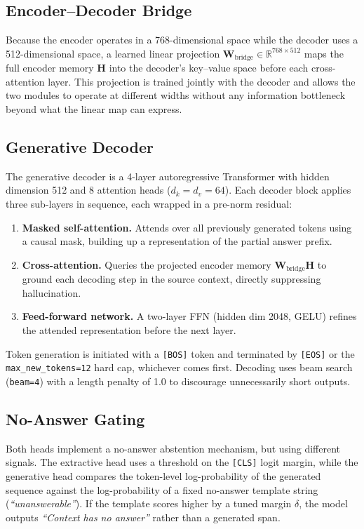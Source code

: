\documentclass[10pt,twocolumn]{article}
\begin{document}
\subsection{Encoder--Decoder Bridge}
Because the encoder operates in a 768-dimensional space while the
decoder uses a 512-dimensional space, a learned linear projection
$\mathbf{W}_{\text{bridge}} \in \mathbb{R}^{768 \times 512}$ maps
the full encoder memory $\mathbf{H}$ into the decoder's key--value
space before each cross-attention layer. This projection is trained
jointly with the decoder and allows the two modules to operate at
different widths without any information bottleneck beyond what
the linear map can express.

\subsection{Generative Decoder}
The generative decoder is a 4-layer autoregressive Transformer with
hidden dimension 512 and 8 attention heads ($d_k = d_v = 64$). Each
decoder block applies three sub-layers in sequence, each wrapped in a
pre-norm residual:

\begin{enumerate}[leftmargin=1.2em,noitemsep,topsep=2pt]
    \item \textbf{Masked self-attention.} Attends over all previously
    generated tokens using a causal mask, building up a
    representation of the partial answer prefix.
    \item \textbf{Cross-attention.} Queries the projected encoder
    memory $\mathbf{W}_{\text{bridge}}\mathbf{H}$ to ground each
    decoding step in the source context, directly suppressing
    hallucination.
    \item \textbf{Feed-forward network.} A two-layer FFN (hidden dim
    2048, GELU) refines the attended representation before the
    next layer.
\end{enumerate}

Token generation is initiated with a \texttt{[BOS]} token and
terminated by \texttt{[EOS]} or the \texttt{max\_new\_tokens=12}
hard cap, whichever comes first. Decoding uses beam search
(\texttt{beam=4}) with a length penalty of 1.0 to discourage
unnecessarily short outputs.

\subsection{No-Answer Gating}
Both heads implement a no-answer abstention mechanism, but using
different signals. The extractive head uses a threshold on the
\texttt{[CLS]} logit margin, while the generative head compares the
token-level log-probability of the generated sequence against the
log-probability of a fixed no-answer template string
(\textit{``unanswerable''}). If the template scores higher by a
tuned margin $\delta$, the model outputs \textit{``Context has no
answer''} rather than a generated span.
\end{document}
